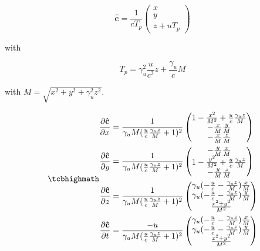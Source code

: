 \begin{equation}
	\mathbf{\hat{c}} = \frac{1}{c T_{p}}
	\begin{pmatrix}
		x \\
		y \\
		z + u T_{p}
	\end{pmatrix}
\end{equation}

with

\begin{equation}
	T_{p} = \gamma_u^2 \frac{u}{c^2}z + \frac{\gamma_u}{c} M
\end{equation}


with $M=\sqrt{x^2 + y^2 + \gamma_u^2 z^2}$.

\begin{equation}
	\mhl
	{
	\begin{aligned}
		\frac{\partial \mathbf{\hat{c}}}{\partial x} &=
	\frac{1}{\gamma_u M ( \frac{u}{c} \frac{\gamma_u z}{M} + 1 )^2}
	\begin{pmatrix}
		1 - \frac{x^2}{M^2} + \frac{u}{c}\frac{\gamma_u z}{M} \\
		- \frac{x}{M} \frac{y}{M} \\
		- \frac{x}{M} \frac{z}{M}
	\end{pmatrix} \\
	\frac{\partial \mathbf{\hat{c}}}{\partial y} &=
	\frac{1}{\gamma_u M ( \frac{u}{c} \frac{\gamma_u z}{M} + 1 )^2}
	\begin{pmatrix}
		- \frac{y}{M} \frac{x}{M} \\
		1 - \frac{y^2}{M^2} + \frac{u}{c}\frac{\gamma_u z}{M} \\
		- \frac{y}{M} \frac{z}{M}
	\end{pmatrix} \\
		\frac{\partial \mathbf{\hat{c}}}{\partial z} &= \frac{1}{\gamma_u M
		(  \frac{u}{c} \frac{\gamma_u z}{M} +  1 )^2}
		\begin{pmatrix}
			\gamma_u ( - \frac{u}{c}  - \frac{ \gamma_u z }{M} ) \frac{x}{M} \\
			\gamma_u ( - \frac{u}{c}  - \frac{\gamma_u z }{M} ) \frac{y}{M} \\
			\frac{ x^2 + y^2 }{M^2}
		\end{pmatrix}\\
		\frac{\partial \mathbf{\hat{c}}}{\partial t} &= \frac{-u}{\gamma_u M (  \frac{u}{c} \frac{\gamma_u z}{M} +  1 )^2}
	\begin{pmatrix}
		\gamma_u ( - \frac{u}{c}  - \frac{ \gamma_u z }{M} ) \frac{x}{M} \\
		\gamma_u ( - \frac{u}{c}  - \frac{\gamma_u z }{M} ) \frac{y}{M} \\
		 \frac{ x^2 + y^2 }{M^2}
	\end{pmatrix}
	\end{aligned}
	}
\end{equation}

